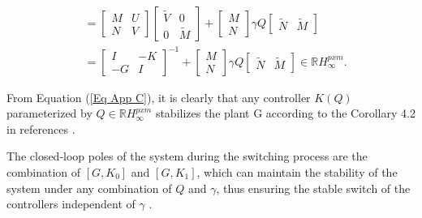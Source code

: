 \documentclass[journal]{IEEEtran}
\begin{document}
\begin{equation}
\begin{aligned}
     & =\left[\begin{array}{cc}M & U \\ N & V\end{array}\right]\left[\begin{array}{cc}\tilde{V} & 0 \\ 0 & \tilde{M}\end{array}\right]+\left[\begin{array}{c}M \\ N\end{array}\right] \gamma Q\left[\begin{array}{cc}\tilde{N} & \tilde{M}\end{array}\right]                       \\
     & =\left[\begin{array}{cc}
        I  & -K \\
        -G & I
      \end{array}\right]^{-1}+\left[\begin{array}{c}
        M \\
        N
      \end{array}\right] \gamma Q\left[\begin{array}{cc}
        \tilde{N} & \tilde{M}
      \end{array}\right] \in \mathbb{R} H_{\infty}^{p x m}.
  \end{aligned}
  \label{Eq App C}
\end{equation}

From Equation (\ref{Eq App C}), it is clearly that any controller $K(Q)$ parameterized by $Q \in \mathbb{R} H_{\infty}^{p x m} $ stabilizes the plant G according to the Corollary 4.2 in references \citep{tay1998high,MAHTOUT202081}.

The closed-loop poles of the system during the switching process are the combination of $[G,K_0]$ and $[G,K_1]$, which can maintain the stability of the system under any combination of $Q$ and $\gamma$, thus ensuring the stable switch of the controllers independent of $\gamma$ \citep{niemann1999architecture}.
\end{document}
